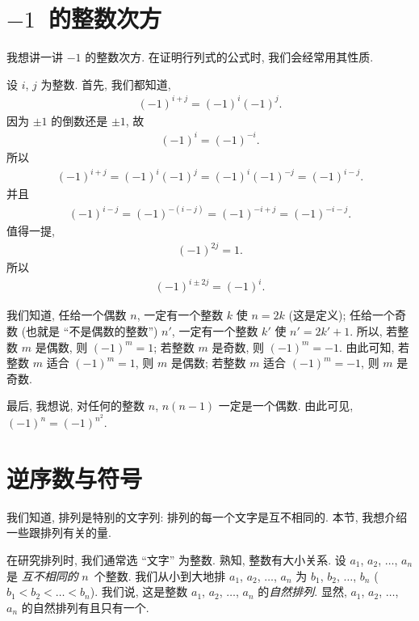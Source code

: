 \section{\texorpdfstring{\(-1\)~的整数次方}{-1 的整数次方}}

我想讲一讲 \(-1\) 的整数次方.
在证明行列式的公式时,
我们会经常用其性质.

设 \(i\), \(j\) 为整数.
首先, 我们都知道,
\begin{align*}
    (-1)^{i+j} = (-1)^{i} (-1)^{j}.
\end{align*}
因为 \(\pm 1\) 的倒数还是 \(\pm 1\), 故
\begin{align*}
    (-1)^{i} = (-1)^{-i}.
\end{align*}
所以
\begin{align*}
    (-1)^{i+j} = (-1)^{i} (-1)^{j}
    = (-1)^{i} (-1)^{-j}
    = (-1)^{i-j}.
\end{align*}
并且
\begin{align*}
    (-1)^{i-j} = (-1)^{-(i-j)} = (-1)^{-i+j}
    = (-1)^{-i-j}.
\end{align*}
值得一提,
\begin{align*}
    (-1)^{2j} = 1.
\end{align*}
所以
\begin{align*}
    (-1)^{i \pm 2j} = (-1)^{i}.
\end{align*}

我们知道, 任给一个偶数 \(n\),
一定有一个整数 \(k\) 使 \(n = 2k\)
(这是定义);
任给一个奇数 (也就是 ``不是偶数的整数'') \(n'\),
一定有一个整数 \(k'\) 使 \(n' = 2k' + 1\).
所以,
若整数 \(m\) 是偶数, 则 \((-1)^m = 1\);
若整数 \(m\) 是奇数, 则 \((-1)^m = -1\).
由此可知,
若整数 \(m\) 适合 \((-1)^m = 1\),
则 \(m\) 是偶数;
若整数 \(m\) 适合 \((-1)^m = -1\),
则 \(m\) 是奇数.

最后, 我想说,
对任何的整数 \(n\),
\(n(n-1)\) 一定是一个偶数.
由此可见, \((-1)^n = (-1)^{n^2}\).

\KunAsteriskoEnEnhavtabelo
\section{逆序数与符号}
\SenAsteriskoEnEnhavtabelo

\maldevigalegajxo

我们知道, 排列是特别的文字列:
排列的每一个文字是互不相同的.
本节, 我想介绍一些跟排列有关的量.

在研究排列时, 我们通常选 ``文字'' 为整数.
熟知, 整数有大小关系.
设 \(a_1\), \(a_2\), \(\dots\), \(a_n\) 是%
\emph{互不相同的} \(n\)~个整数.
我们从小到大地排
\(a_1\), \(a_2\), \(\dots\), \(a_n\)
为
\(b_1\), \(b_2\), \(\dots\), \(b_n\)
(\(b_1 < b_2 < \dots < b_n\)).
我们说, 这是整数 \(a_1\), \(a_2\), \(\dots\), \(a_n\)
的\emph{自然排列}.
显然, \(a_1\), \(a_2\), \(\dots\), \(a_n\)
的自然排列有且只有一个.

